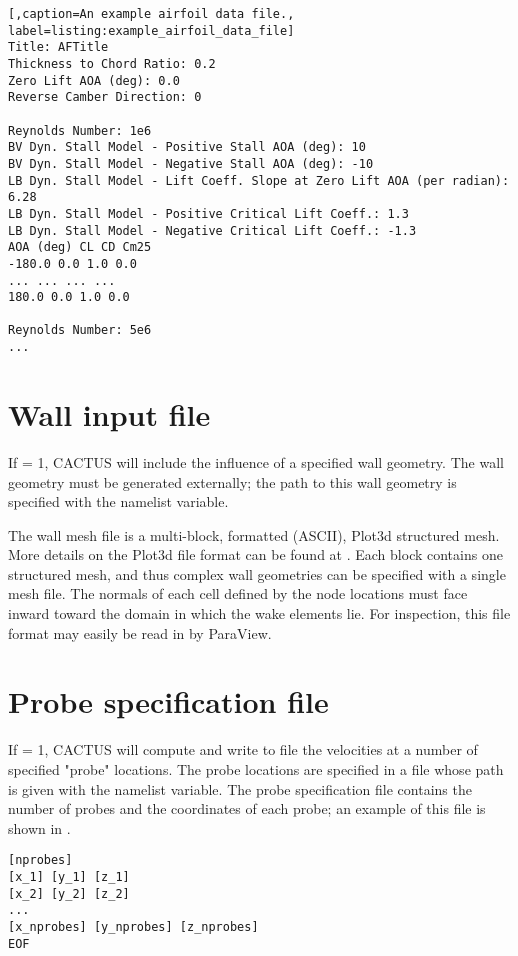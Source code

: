 \begin{lstlisting}[,caption=An example airfoil data file., label=listing:example_airfoil_data_file]
Title: AFTitle
Thickness to Chord Ratio: 0.2
Zero Lift AOA (deg): 0.0
Reverse Camber Direction: 0

Reynolds Number: 1e6
BV Dyn. Stall Model - Positive Stall AOA (deg): 10
BV Dyn. Stall Model - Negative Stall AOA (deg): -10
LB Dyn. Stall Model - Lift Coeff. Slope at Zero Lift AOA (per radian): 6.28
LB Dyn. Stall Model - Positive Critical Lift Coeff.: 1.3
LB Dyn. Stall Model - Negative Critical Lift Coeff.: -1.3
AOA (deg) CL CD Cm25
-180.0 0.0 1.0 0.0
... ... ... ...
180.0 0.0 1.0 0.0

Reynolds Number: 5e6
...
\end{lstlisting}


\section{Wall input file}
If  = 1, CACTUS will include the influence of a specified wall geometry. The wall geometry must be generated externally; the path to this wall geometry is specified with the  namelist variable.

The wall mesh file is a multi-block, formatted (ASCII), Plot3d structured mesh. More details on the Plot3d file format can be found at . Each block contains one structured mesh, and thus complex wall geometries can be specified with a single mesh file. The normals of each cell defined by the node locations must face inward toward the domain in which the wake elements lie. For inspection, this file format may easily be read in by ParaView.

\section{Probe specification file}
If  = 1, CACTUS will compute and write to file the velocities at a number of specified "probe" locations. The probe locations are specified in a file whose path is given with the  namelist variable. The probe specification file contains the number of probes and the coordinates of each probe; an example of this file is shown in .

\begin{lstlisting}[label=listing:probespec_file_example,caption=Format for the probe specification file.]
[nprobes]
[x_1] [y_1] [z_1]
[x_2] [y_2] [z_2]
...
[x_nprobes] [y_nprobes] [z_nprobes]
EOF
\end{lstlisting}
